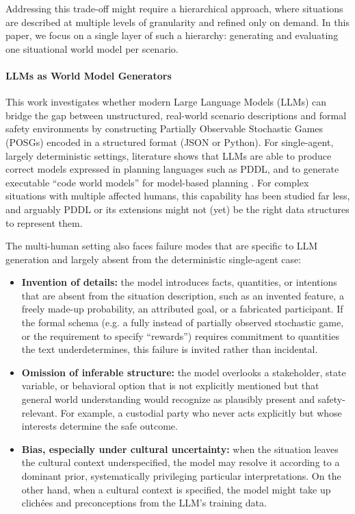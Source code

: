 \documentclass{article}
\begin{document}
Addressing this trade-off might require a hierarchical approach, where situations are described at multiple levels of granularity and refined only on demand. %
In this paper, we focus on a single layer of such a hierarchy: generating and evaluating one situational world model per scenario.

\paragraph{LLMs as World Model Generators}
This work investigates whether modern Large Language Models (LLMs) can bridge the gap between unstructured, real-world scenario descriptions and formal safety environments by constructing Partially Observable Stochastic Games (POSGs) encoded in a structured format (JSON or Python). For single-agent, largely deterministic settings, literature shows that LLMs are able to produce correct models expressed in planning languages such as PDDL, and to generate executable ``code world models'' for model-based planning \citet{cao2025large,dainese2024generating}. For complex situations with multiple affected humans, this capability has been studied far less, and arguably PDDL or its extensions might not (yet) be the right data structures to represent them.

The multi-human setting also faces failure modes that are specific to LLM generation and largely absent from the deterministic single-agent case:
\begin{itemize}
    \item \textbf{Invention of details:} the model introduces facts, quantities, or intentions that are absent from the situation description, such as an invented feature, a freely made-up probability, an attributed goal, or a fabricated participant. If the formal schema (e.g. a fully instead of partially observed stochastic game, or the requirement to specify ``rewards'') requires commitment to quantities the text underdetermines, this failure is invited rather than incidental.
    \item \textbf{Omission of inferable structure:} the model overlooks a stakeholder, state variable, or behavioral option that is not explicitly mentioned but that general world understanding would recognize as plausibly present and safety-relevant. For example, a custodial party who never acts explicitly but whose interests determine the safe outcome.
    \item \textbf{Bias, especially under cultural uncertainty:} when the situation leaves the cultural context underspecified, the model may resolve it according to a dominant prior, systematically privileging particular interpretations. On the other hand, when a cultural context is specified, the model might take up clich\'ees and preconceptions from the LLM's training data.
\end{itemize}
\end{document}
